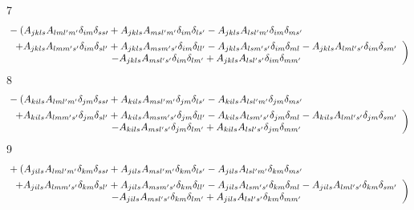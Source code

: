 \documentclass[aps,preprint]{revtex4}%
\begin{document}
7%
\begin{align}
&  -\left(  A_{jkls}A_{lml^{\prime}m^{\prime}}\delta_{im}\delta_{ss\prime
}+A_{jkls}A_{msl^{\prime}m^{\prime}}\delta_{im}\delta_{ls^{\prime}}%
-A_{jkls}A_{lsl^{\prime}m^{\prime}}\delta_{im}\delta_{ms^{\prime}}\right. \\
&  \left.
\begin{array}
[c]{c}%
+A_{jkls}A_{lmm^{\prime}s^{\prime}}\delta_{im}\delta_{sl^{\prime}}%
+A_{jkls}A_{msm^{\prime}s^{\prime}}\delta_{im}\delta_{ll^{\prime}}%
-A_{jkls}A_{lsm^{\prime}s^{\prime}}\delta_{im}\delta_{ml}-A_{jkls}%
A_{lml^{\prime}s^{\prime}}\delta_{im}\delta_{sm^{\prime}}\\
-A_{jkls}A_{msl^{\prime}s^{\prime}}\delta_{im}\delta_{lm^{\prime}}%
+A_{jkls}A_{lsl^{\prime}s^{\prime}}\delta_{im}\delta_{mm^{\prime}}%
\end{array}
\right)
\end{align}
8%
\begin{align}
&  -\left(  A_{kils}A_{lml^{\prime}m^{\prime}}\delta_{jm}\delta_{ss\prime
}+A_{kils}A_{msl^{\prime}m^{\prime}}\delta_{jm}\delta_{ls^{\prime}}%
-A_{kils}A_{lsl^{\prime}m^{\prime}}\delta_{jm}\delta_{ms^{\prime}}\right. \\
&  \left.
\begin{array}
[c]{c}%
+A_{kils}A_{lmm^{\prime}s^{\prime}}\delta_{jm}\delta_{sl^{\prime}}%
+A_{kils}A_{msm^{\prime}s^{\prime}}\delta_{jm}\delta_{ll^{\prime}}%
-A_{kils}A_{lsm^{\prime}s^{\prime}}\delta_{jm}\delta_{ml}-A_{kils}%
A_{lml^{\prime}s^{\prime}}\delta_{jm}\delta_{sm^{\prime}}\\
-A_{kils}A_{msl^{\prime}s^{\prime}}\delta_{jm}\delta_{lm^{\prime}}%
+A_{kils}A_{lsl^{\prime}s^{\prime}}\delta_{jm}\delta_{mm^{\prime}}%
\end{array}
\right)
\end{align}
9%
\begin{align}
&  +\left(  A_{jils}A_{lml^{\prime}m^{\prime}}\delta_{km}\delta_{ss\prime
}+A_{jils}A_{msl^{\prime}m^{\prime}}\delta_{km}\delta_{ls^{\prime}}%
-A_{jils}A_{lsl^{\prime}m^{\prime}}\delta_{km}\delta_{ms^{\prime}}\right. \\
&  \left.
\begin{array}
[c]{c}%
+A_{jils}A_{lmm^{\prime}s^{\prime}}\delta_{km}\delta_{sl^{\prime}}%
+A_{jils}A_{msm^{\prime}s^{\prime}}\delta_{km}\delta_{ll^{\prime}}%
-A_{jils}A_{lsm^{\prime}s^{\prime}}\delta_{km}\delta_{ml}-A_{jils}%
A_{lml^{\prime}s^{\prime}}\delta_{km}\delta_{sm^{\prime}}\\
-A_{jils}A_{msl^{\prime}s^{\prime}}\delta_{km}\delta_{lm^{\prime}}%
+A_{jils}A_{lsl^{\prime}s^{\prime}}\delta_{km}\delta_{mm^{\prime}}%
\end{array}
\right)
\end{align}
\end{document}
